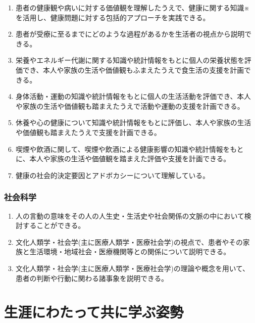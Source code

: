 \begin{enumerate}
\def\labelenumi{\arabic{enumi}.}
\tightlist
\item
  患者の健康観や病いに対する価値観を理解したうえで、健康に関する知識※を活用し、健康問題に対する包括的アプローチを実践できる。
\item
  患者が受療に至るまでにどのような過程があるかを生活者の視点から説明できる。
\item
  栄養やエネルギー代謝に関する知識や統計情報をもとに個人の栄養状態を評価でき、本人や家族の生活や価値観もふまえたうえで食生活の支援を計画できる。
\item
  身体活動・運動の知識や統計情報をもとに個人の生活活動を評価でき、本人や家族の生活や価値観も踏まえたうえで活動や運動の支援を計画できる。
\item
  休養や心の健康について知識や統計情報をもとに評価し、本人や家族の生活や価値観も踏まえたうえで支援を計画できる。
\item
  喫煙や飲酒に関して、喫煙や飲酒による健康影響の知識や統計情報をもとに、本人や家族の生活や価値観を踏まえた評価や支援を計画できる。
\item
  健康の社会的決定要因とアドボカシーについて理解している。
\end{enumerate}

\hypertarget{ux793eux4f1aux79d1ux5b66}{%
\subsubsection{社会科学}\label{ux793eux4f1aux79d1ux5b66}}

\begin{enumerate}
\def\labelenumi{\arabic{enumi}.}
\tightlist
\item
  人の言動の意味をその人の人生史・生活史や社会関係の文脈の中において検討することができる。
\item
  文化人類学・社会学(主に医療人類学・医療社会学)の視点で、患者やその家族と生活環境・地域社会・医療機関等との関係について説明できる。
\item
  文化人類学・社会学(主に医療人類学・医療社会学)の理論や概念を用いて、患者の判断や行動に関わる諸事象を説明できる。
\end{enumerate}

\newpage

\hypertarget{ux751fux6dafux306bux308fux305fux3063ux3066ux5171ux306bux5b66ux3076ux59ffux52e2}{%
\section{生涯にわたって共に学ぶ姿勢}\label{ux751fux6dafux306bux308fux305fux3063ux3066ux5171ux306bux5b66ux3076ux59ffux52e2}}

